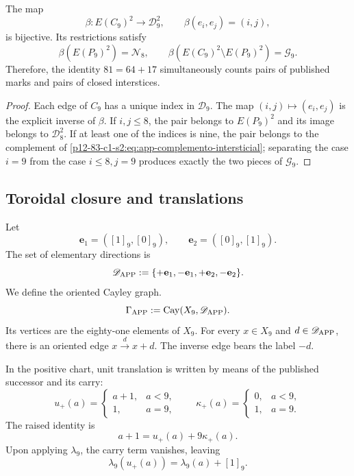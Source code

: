 \begin{theorem}
\label{p12-83-c1-s2:thm:app-equivalencia-modelos}
The map
\[
 \beta:E(C_9)^2\longrightarrow\mathcal D_9^2,
 \qquad
 \beta(e_i,e_j)=(i,j),
\]
is bijective. Its restrictions satisfy
\[
 \beta(E(P_9)^2)=\mathcal N_8,
 \qquad
 \beta(E(C_9)^2\setminus E(P_9)^2)=\mathcal G_9.
\]
Therefore, the identity \(81=64+17\) simultaneously counts pairs of
published marks and pairs of closed interstices.
\end{theorem}

\begin{proof}
Each edge of \(C_9\) has a unique index in \(\mathcal D_9\). The map \((i,j)\mapsto(e_i,e_j)\) is the explicit inverse of \(\beta\). If \(i,j\leq8\), the pair belongs to \(E(P_9)^2\) and its image belongs to \(\mathcal D_8^2\). If at least one of the indices is nine, the pair belongs to the complement of \cref{p12-83-c1-s2:eq:app-complemento-intersticial}; separating the case \(i=9\) from the case \(i\leq8,j=9\) produces exactly the two pieces of \(\mathcal G_9\).
\end{proof}

\subsection{Toroidal closure and translations}

Let
\[
 \mathbf e_1=([1]_9,[0]_9),
 \qquad
 \mathbf e_2=([0]_9,[1]_9).
\]
The set of elementary directions is
\[
 \mathscr D_{\rm APP}:=
 \{+\mathbf e_1,-\mathbf e_1,+\mathbf e_2,-\mathbf e_2\}.
\]
We define the oriented Cayley graph.
\[
 \Gamma_{\rm APP}:=\operatorname{Cay}(X_9,\mathscr D_{\rm APP}).
\]
Its vertices are the eighty-one elements of \(X_9\). For every
\(x\in X_9\) and \(d\in\mathscr D_{\rm APP}\), there is an oriented edge
\(x\xrightarrow{d}x+d\). The inverse edge bears the label \(-d\).

In the positive chart, unit translation is written by means of the published
successor and its carry:
\[
 u_+(a)=
 \begin{cases}
  a+1,&a<9,\\
  1,&a=9,
 \end{cases}
 \qquad
 \kappa_+(a)=
 \begin{cases}
  0,&a<9,\\
  1,&a=9.
 \end{cases}
\]
The raised identity is
\begin{equation}
 a+1=u_+(a)+9\kappa_+(a).
\label{p12-83-c1-s2:eq:app-sucesor-publicado-acarreo}
\end{equation}
Upon applying \(\lambda_9\), the carry term vanishes, leaving
\[
 \lambda_9(u_+(a))=\lambda_9(a)+[1]_9.
\]

